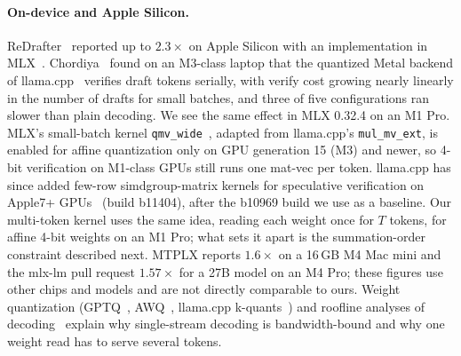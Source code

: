\paragraph{On-device and Apple Silicon.}
ReDrafter~\cite{cheng2024redrafter} reported up to $2.3\times$ on Apple Silicon with an implementation in MLX~\cite{hannun2023mlx}.
Chordiya~\cite{chordiya2026lossless} found on an M3-class laptop that the quantized Metal backend of llama.cpp~\cite{gerganov2023llamacpp} verifies draft tokens serially, with verify cost growing nearly linearly in the number of drafts for small batches, and three of five configurations ran slower than plain decoding.
We see the same effect in MLX 0.32.4 on an M1 Pro.
MLX's small-batch kernel \texttt{qmv\_wide}~\cite{gross2026qmvwide}, adapted from llama.cpp's \texttt{mul\_mv\_ext}, is enabled for affine quantization only on GPU generation 15 (M3) and newer, so 4-bit verification on M1-class GPUs still runs one mat-vec per token.
llama.cpp has since added few-row simdgroup-matrix kernels for speculative verification on Apple7+ GPUs~\cite{narola2026fewrow} (build b11404), after the b10969 build we use as a baseline.
Our multi-token kernel uses the same idea, reading each weight once for $T$ tokens, for affine 4-bit weights on an M1 Pro; what sets it apart is the summation-order constraint described next.
MTPLX reports $1.6\times$ on a 16\,GB M4 Mac mini and the mlx-lm pull request $1.57\times$ for a 27B model on an M4 Pro; these figures use other chips and models and are not directly comparable to ours.
Weight quantization (GPTQ~\cite{frantar2023gptq}, AWQ~\cite{lin2024awq}, llama.cpp k-quants~\cite{kawrakow2023kquants}) and roofline analyses of decoding~\cite{williams2009roofline,pope2022scaling,yuan2024unveiled} explain why single-stream decoding is bandwidth-bound and why one weight read has to serve several tokens.


